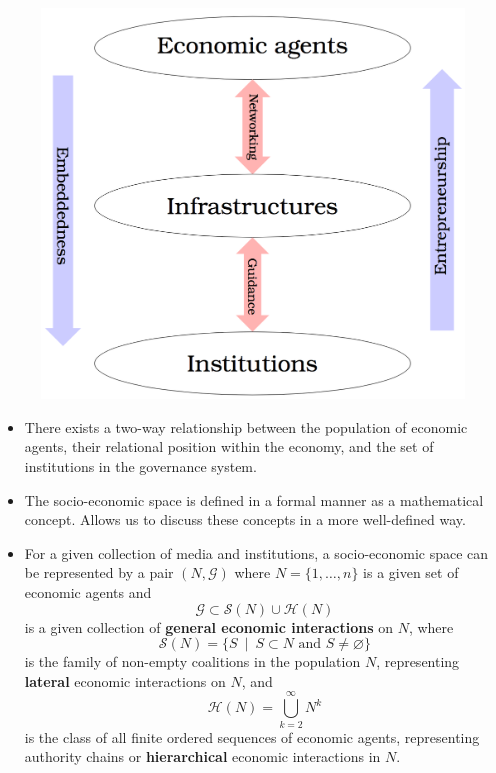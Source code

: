 \documentclass[9pt]{beamer}
\begin{document}
\begin{frame} %
\begin{figure}[h]
\centering
\includegraphics[scale=0.15]{../Images/structure-space.png}
\end{figure}
\begin{itemize}
\item There exists a two-way relationship between the population of economic agents, their relational position within the economy, and the set of institutions in the governance system.
\end{itemize}
\end{frame}

\begin{frame} %
\begin{itemize}
\item The socio-economic space is defined in a formal manner as a mathematical concept. Allows us to discuss these concepts in a more well-defined way.
\medskip
\item For a given collection of media and institutions, a socio-economic space can be represented by a pair $(N, \mathcal{G})$ where $N = \{1, \ldots, n\}$ is a given set of economic agents and
\begin{equation*}
\mathcal{G} \subset \mathcal{S}(N) \cup \mathcal{H}(N)
\end{equation*}
is a given collection of \textbf{general economic interactions} on $N$, where
\begin{equation*}
\mathcal{S}(N) = \{ S ~ \mid ~ S \subset N \mbox{ and } S \neq \varnothing \}
\end{equation*}
is the family of non-empty coalitions in the population $N$, representing \textbf{lateral} economic interactions on $N$, and
\begin{equation*}
\mathcal{H}(N) = \bigcup_{k = 2}^{\infty} N^{k}
\end{equation*}
is the class of all finite ordered sequences of economic agents, representing authority chains or \textbf{hierarchical} economic interactions in $N$.
\end{itemize}
\end{frame}
\end{document}
